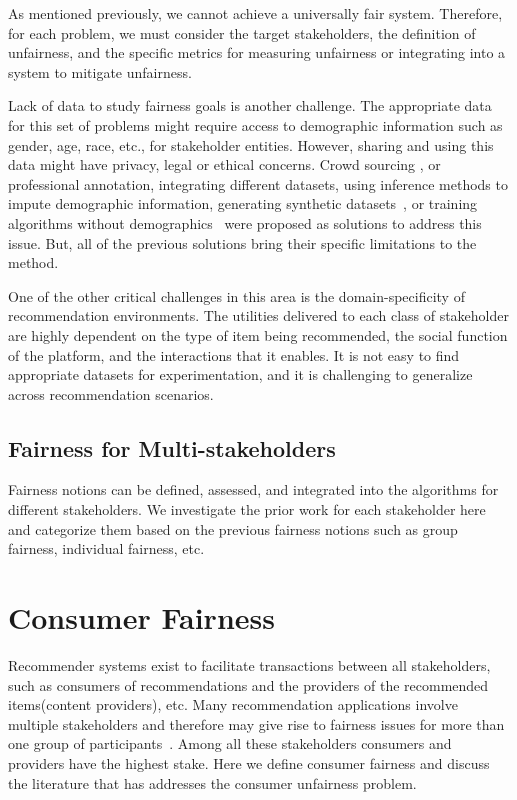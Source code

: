             As mentioned previously, we cannot achieve a universally fair system. Therefore, for each problem, we must consider the target stakeholders, the definition of unfairness, and the specific metrics for measuring unfairness or integrating into a system to mitigate unfairness.

            Lack of data to study fairness goals is another challenge. The appropriate data for this set of problems might require access to demographic information such as gender, age, race, etc., for stakeholder entities. However, sharing and using this data might have privacy, legal or ethical concerns. Crowd sourcing \cite{biega2020overview}, or professional annotation, integrating different datasets, using inference methods to impute demographic information, generating synthetic datasets~\cite{burke2018synthetic}, or training algorithms without demographics~\cite{Kallus2020Assessing} were proposed as solutions to address this issue. But, all of the previous solutions bring their specific limitations to the method. 

            One of the other critical challenges in this area is the domain-specificity of recommendation environments. The utilities delivered to each class of stakeholder are highly dependent on the type of item being recommended, the social function of the platform, and the interactions that it enables. It is not easy to find appropriate datasets for experimentation, and it is challenging to generalize across recommendation scenarios.
        
    \subsection{Fairness for Multi-stakeholders}
    
        Fairness notions can be defined, assessed, and integrated into the algorithms for different stakeholders. We investigate the prior work for each stakeholder here and categorize them based on the previous fairness notions such as group fairness, individual fairness, etc.






\section{Consumer Fairness}
\label{sec:fairness_cf}

    Recommender systems exist to facilitate transactions between all stakeholders, such as consumers of recommendations and the providers of the recommended items(content providers), etc. Many recommendation applications involve multiple stakeholders and therefore may give rise to fairness issues for more than one group of participants~\cite{burke_multisided_2017}. Among all these stakeholders consumers and providers have the highest stake. Here we  define consumer fairness and discuss the literature that has addresses the consumer unfairness problem.

